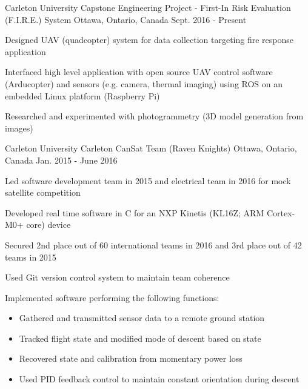 

\begin{cventries}

  \cventry
    {Carleton University} %
    {Capstone Engineering Project - First-In Risk Evaluation (F.I.R.E.) System} %
    {Ottawa, Ontario, Canada} %
    {Sept. 2016 - Present} %
    {
      \begin{cvitems} %
        \item {Designed UAV (quadcopter) system for data collection targeting fire response application}
        \item {Interfaced high level application with open source UAV control software (Arducopter) and sensors (e.g. camera, thermal imaging) using ROS on an embedded Linux platform (Raspberry Pi)}
        \item {Researched and experimented with photogrammetry (3D model generation from images)}
      \end{cvitems}
    }

  \cventry
    {Carleton University} %
    {Carleton CanSat Team (Raven Knights)} %
    {Ottawa, Ontario, Canada} %
    {Jan. 2015 - June 2016} %
    {
      \begin{cvitems} %
        \item {Led software development team in 2015 and electrical team in 2016 for mock satellite competition}
        \item {Developed real time software in C for an NXP Kinetis (KL16Z; ARM Cortex-M0+ core) device}
        \item {Secured 2nd place out of 60 international teams in 2016 and 3rd place out of 42 teams in 2015}
        \item {Used Git version control system to maintain team coherence}
        \item {Implemented software performing the following functions:}
        \begin{itemize}
          \item {Gathered and transmitted sensor data to a remote ground station}
          \item {Tracked flight state and modified mode of descent based on state}
          \item {Recovered state and calibration from momentary power loss}
          \item {Used PID feedback control to maintain constant orientation during descent}
        \end{itemize}
      \end{cvitems}
    }


\end{cventries}
